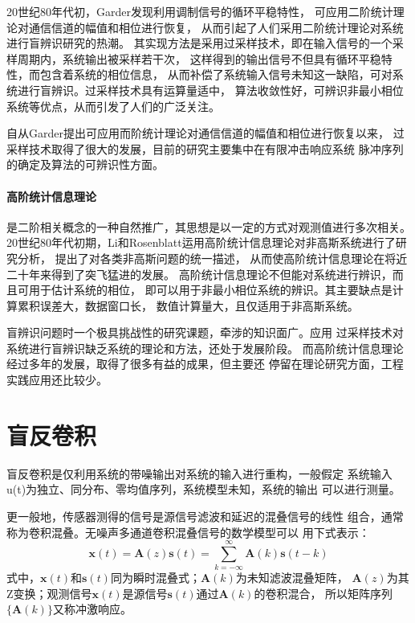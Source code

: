 20世纪80年代初，Garder发现利用调制信号的循环平稳特性，
可应用二阶统计理论对通信信道的幅值和相位进行恢复，
从而引起了人们采用二阶统计理论对系统进行盲辨识研究的热潮。
其实现方法是采用过采样技术，即在输入信号的一个采样周期内，系统输出被采样若干次，
这样得到的输出信号不但具有循环平稳特性，而包含着系统的相位信息，
从而补偿了系统输入信号未知这一缺陷，可对系统进行盲辨识。过采样技术具有运算量适中，
算法收敛性好，可辨识非最小相位系统等优点，从而引发了人们的广泛关注。

自从Garder提出可应用而阶统计理论对通信信道的幅值和相位进行恢复以来，
过采样技术取得了很大的发展，目前的研究主要集中在有限冲击响应系统
脉冲序列的确定及算法的可辨识性方面。

\paragraph*{高阶统计信息理论}
是二阶相关概念的一种自然推广，其思想是以一定的方式对观测值进行多次相关。
20世纪80年代初期，Li和Rosenblatt运用高阶统计信息理论对非高斯系统进行了研究分析，
提出了对各类非高斯问题的统一描述，
从而使高阶统计信息理论在将近二十年来得到了突飞猛进的发展。
高阶统计信息理论不但能对系统进行辨识，而且可用于估计系统的相位，
即可以用于非最小相位系统的辨识。其主要缺点是计算累积误差大，数据窗口长，
数值计算量大，且仅适用于非高斯系统。

盲辨识问题时一个极具挑战性的研究课题，牵涉的知识面广。应用
过采样技术对系统进行盲辨识缺乏系统的理论和方法，还处于发展阶段。
而高阶统计信息理论经过多年的发展，取得了很多有益的成果，但主要还
停留在理论研究方面，工程实践应用还比较少。

\section{盲反卷积}
盲反卷积是仅利用系统的带噪输出对系统的输入进行重构，一般假定
系统输入u(t)为独立、同分布、零均值序列，系统模型未知，系统的输出
可以进行测量。

    更一般地，传感器测得的信号是源信号滤波和延迟的混叠信号的线性
组合，通常称为卷积混叠。无噪声多通道卷积混叠信号的数学模型可以
用下式表示：
\begin{equation} 
\bm{x}(t)=\bm{A}(z)\bm{s}(t) = 
\sum^\infty_{k=-\infty}\bm{A}(k)\bm{s}(t-k)
\end{equation}
式中，$\bm{x}(t)$和$\bm{s}(t)$同为瞬时混叠式；$\bm{A}(k)$为未知滤波混叠矩阵，
$\bm{A}(z)$为其Z变换；观测信号$\bm{x}(t)$是源信号$\bm{s}(t)$通过$\bm{A}(k)$的卷积混合，
所以矩阵序列$\{\bm{A}(k)\}$又称冲激响应。
    
